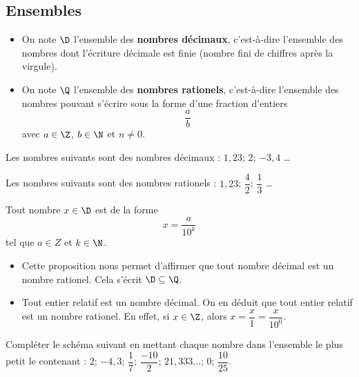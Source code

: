 \documentclass{article}
\begin{document}
\subsection{Ensembles}
\begin{definition}
\hfill
\begin{itemize}
\item On note $\D$ l'ensemble des \textbf{nombres décimaux}, c'est-à-dire l'ensemble des nombres dont l'écriture décimale est finie (nombre fini de chiffres après la virgule).
\item On note $\Q$ l'ensemble des \textbf{nombres rationels}, c'est-à-dire l'ensemble des nombres pouvant s'écrire sous la forme d'une fraction d'entiers
\begin{equation*}
\dfrac{a}{b}
\end{equation*}
avec $a \in \Z$, $b \in \N$ et $n \neq 0$.
\end{itemize}
\end{definition}
\begin{example}
Les nombres suivants sont des nombres décimaux : $1,23$; $2$; $-3,4$ \dots

Les nombres suivants sont des nombres rationels :
$1,23$; $\dfrac{4}{2}$; $\dfrac{1}{3}$ \dots
\end{example}
\begin{proposition}
Tout nombre $x \in \D$ est de la forme
\begin{equation*}
x = \dfrac{a}{10^k}
\end{equation*}
tel que $a \in Z$ et $k \in \N$.
\end{proposition}
\begin{remark}
\hfill
\begin{itemize}
\item Cette proposition nous permet d'affirmer que tout nombre décimal est un nombre rationel. Cela s'écrit $\D \subseteq \Q$.
\item Tout entier relatif est un nombre décimal. On en déduit que tout entier relatif est un nombre rationel. En effet, si $x \in \Z$, alors $x = \dfrac{x}{1} = \dfrac{x}{10^0}$. 
\end{itemize}
\end{remark}
\begin{example}
Compléter le schéma suivant en mettant chaque nombre dans l'ensemble le plus petit le contenant :
$2$; $-4,3$; $\dfrac{1}{7}$; $\dfrac{-10}{2}$; $21,333\dots$; $0$; $\dfrac{10}{25}$.
\begin{center}
\end{center}
\end{example}
\newpage
\end{document}
